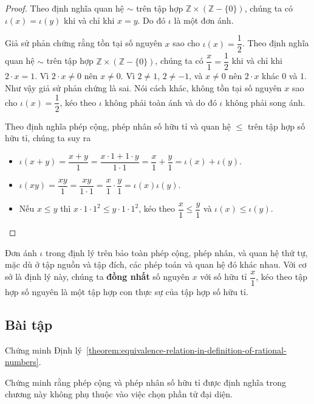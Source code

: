 \begin{proof}
    Theo định nghĩa quan hệ $\sim$ trên tập hợp $\mathbb{Z}\times (\mathbb{Z} - \{0\})$, chúng ta có $\iota(x) = \iota(y)$ khi và chỉ khi $x = y$. Do đó $\iota$ là một đơn ánh.

    Giả sử phản chứng rằng tồn tại số nguyên $x$ sao cho $\iota(x) = \dfrac{1}{2}$. Theo định nghĩa quan hệ $\sim$ trên tập hợp $\mathbb{Z}\times (\mathbb{Z} - \{0\})$, chúng ta có $\dfrac{x}{1} = \dfrac{1}{2}$ khi và chỉ khi $2\cdot x = 1$. Vì $2\cdot x\ne 0$ nên $x\ne 0$. Vì $2\ne 1$, $2\ne -1$, và $x\ne 0$ nên $2\cdot x$ khác $0$ và $1$. Như vậy giả sử phản chứng là sai. Nói cách khác, không tồn tại số nguyên $x$ sao cho $\iota(x) = \dfrac{1}{2}$, kéo theo $\iota$ không phải toàn ánh và do đó $\iota$ không phải song ánh.

    Theo định nghĩa phép cộng, phép nhân số hữu tỉ và quan hệ $\leq$ trên tập hợp số hữu tỉ, chúng ta suy ra
    \begin{itemize}
        \item $\iota(x + y) = \dfrac{x + y}{1} = \dfrac{x\cdot 1 + 1\cdot y}{1\cdot 1} = \dfrac{x}{1} + \dfrac{y}{1} = \iota(x) + \iota(y)$.
        \item $\iota(xy) = \dfrac{xy}{1} = \dfrac{xy}{1\cdot 1} = \dfrac{x}{1}\cdot\dfrac{y}{1} = \iota(x)\iota(y)$.
        \item Nếu $x\leq y$ thì $x\cdot 1\cdot 1^{2}\leq y\cdot 1\cdot 1^{2}$, kéo theo $\dfrac{x}{1}\leq \dfrac{y}{1}$ và $\iota(x)\leq \iota(y)$.
    \end{itemize}
\end{proof}

Đơn ánh $\iota$ trong định lý trên bảo toàn phép cộng, phép nhân, và quan hệ thứ tự, mặc dù ở tập nguồn và tập đích, các phép toán và quan hệ đó khác nhau. Với cơ sở là định lý này, chúng ta \textbf{đồng nhất} số nguyên $x$ với số hữu tỉ $\dfrac{x}{1}$, kéo theo tập hợp số nguyên là một tập hợp con thực sự của tập hợp số hữu tỉ.

\subsection{Bài tập}

\begin{exercise}
    Chứng minh Định lý~\ref{theorem:equivalence-relation-in-definition-of-rational-numbers}.
\end{exercise}

\begin{exercise}
    Chứng minh rằng phép cộng và phép nhân số hữu tỉ được định nghĩa trong chương này không phụ thuộc vào việc chọn phần tử đại diện.
\end{exercise}

